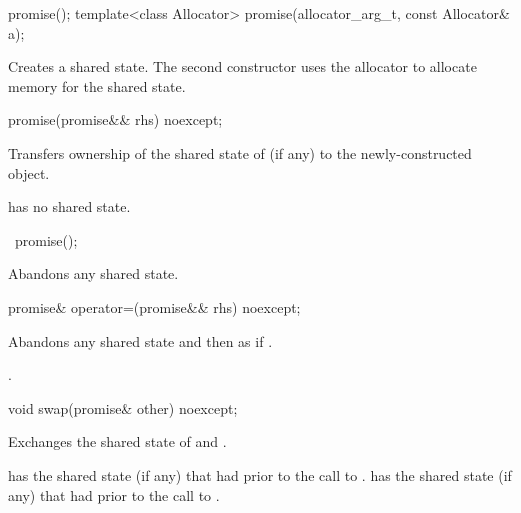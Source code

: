 %
\begin{itemdecl}
promise();
template<class Allocator>
  promise(allocator_arg_t, const Allocator& a);
\end{itemdecl}

\begin{itemdescr}
\pnum
\effects
Creates a shared state. The second
constructor uses the allocator  to allocate memory for the shared
state.
\end{itemdescr}

%
\begin{itemdecl}
promise(promise&& rhs) noexcept;
\end{itemdecl}

\begin{itemdescr}
\pnum
\effects
Transfers ownership of the shared state
of  (if any) to the newly-constructed object.

\pnum
\ensures
{} has no shared state.
\end{itemdescr}

%
\begin{itemdecl}
~promise();
\end{itemdecl}

\begin{itemdescr}
\pnum
\effects
Abandons any shared state.
\end{itemdescr}

%
\begin{itemdecl}
promise& operator=(promise&& rhs) noexcept;
\end{itemdecl}

\begin{itemdescr}
\pnum
\effects
Abandons any shared state and then as if
.

\pnum
\returns
{}.
\end{itemdescr}

%
\begin{itemdecl}
void swap(promise& other) noexcept;
\end{itemdecl}

\begin{itemdescr}
\pnum
\effects
Exchanges the shared state of  and .

\pnum
\ensures
{} has the shared state (if any) that  had
prior to the call to .  has the shared state (if any) that
 had prior to the call to .
\end{itemdescr}

